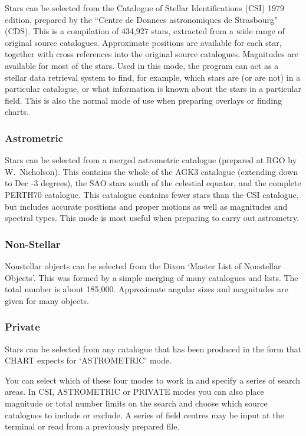 \documentclass[twoside,11pt]{article}
\newcommand{\htmladdnormallink}[2]{#1}
\newcommand{\xref}[3]{#1}
\newcommand{\RGOref}{\htmladdnormallink{RGO}{http://www.ast.cam.ac.uk/RGO/RGO.html}}
\newcommand{\CHARTref}{\xref{CHART}{sun32}{}}
\begin{document}
Stars can be selected from the Catalogue of Stellar Identifications (CSI)
1979 edition, prepared by the ``Centre de Donnees astronomiques de
Strasbourg" (CDS). This is a
compilation of 434,927 stars, extracted from a wide range of original source
catalogues. Approximate positions are available for each star, together with
cross references into the original source catalogues. Magnitudes are
available for most of the stars. Used in this mode, the program can act as a
stellar data retrieval system to find, for example, which stars are (or are
not) in a particular catalogue, or what information is known about the stars
in a particular field. This is also the normal mode of use when preparing
overlays or finding charts.

\subsubsection{Astrometric}

Stars can be selected from a merged astrometric catalogue (prepared at {\RGOref} by
W.~Nicholson). This contains the whole of the AGK3 catalogue (extending down
to Dec -3 degrees), the SAO stars south of the celestial equator, and the complete
PERTH70 catalogue. This catalogue contains fewer stars than the CSI
catalogue, but includes accurate positions and proper motions as well as
magnitudes and spectral types. This mode is most useful when preparing to
carry out astrometry.

\subsubsection{Non-Stellar}

Nonstellar objects can be selected from the Dixon `Master List of Nonstellar
Objects'. This was formed by a simple merging of many catalogues and lists.
The total number is about 185,000. Approximate angular sizes and magnitudes
are given for many objects.

\subsubsection{Private}

Stars can be selected from any catalogue that has been produced in the form
that {\CHARTref} expects for `ASTROMETRIC' mode.

You can select which of these four modes to work in and specify a series of
search areas. In CSI, ASTROMETRIC or PRIVATE modes you can also place
magnitude or total number limits on the search and choose which source
catalogues to include or exclude. A series of field centres may be input at
the terminal or read from a previously prepared file.
\end{document}
